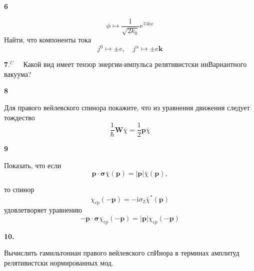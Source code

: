\documentclass[a4paper,12pt]{article} %
\begin{document}
\begin{ttask}\textbf{6}


$$
\phi \mapsto \frac{1}{\sqrt{2 k_{0}}} \mathrm{e}^{\mp \mathrm{i} k x}
$$
Найти, что компоненты тока
$$
j^{0} \mapsto \pm e, \quad j^{\alpha} \mapsto \pm e \boldsymbol{k}
$$


\end{ttask}



\begin{ttask}

$\mathbf{7} .^{C} \quad$ Какой вид имеет тензор энергии-импульса релятивистски инВариантного вакуума?


\end{ttask}



\begin{ttask}\textbf{8}


Для правого вейлевского спинора покажите, что из уравнения движения следует тождество
$$
\frac{1}{\hbar} \boldsymbol{W} \bar{\chi}=\frac{1}{2} \boldsymbol{p} \bar{\chi}
$$






\end{ttask}



\begin{ttask}\textbf{9}


Показать, что если
$$
\boldsymbol{p} \cdot \boldsymbol{\sigma} \bar{\chi}(\boldsymbol{p})=|\boldsymbol{p}| \bar{\chi}(\boldsymbol{p}),
$$

то спинор
$$
\chi_{c p}(-\boldsymbol{p})=-\mathrm{i} \sigma_{2} \bar{\chi}^{*}(\boldsymbol{p})
$$
удовлетворяет уравнению
$$
-\boldsymbol{p} \cdot \boldsymbol{\sigma} \chi_{c p}(-\boldsymbol{p})=|\boldsymbol{p}| \chi_{c p}(-\boldsymbol{p})
$$


\end{ttask}



\begin{ttask} \textbf{10.}
	
	 
Вычислить гамильтониан правого вейлевского спИнора в терминах амплитуд релятивистски нормированных мод. 










\end{ttask}
\end{document}
